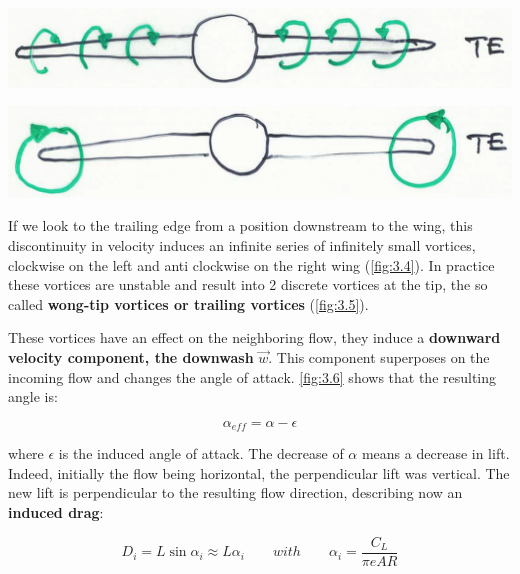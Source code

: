 	\begin{center}
	\begin{minipage}{0.4\textwidth}
	\includegraphics[scale=0.25]{ch3/4}
	\label{fig:3.4}
	\end{minipage}
	\begin{minipage}{0.4\textwidth}
	\includegraphics[scale=0.22]{ch3/5}
	\label{fig:3.5}
	\end{minipage}
	\end{center}
	
	If we look to the trailing edge from a position downstream to the wing, this discontinuity in velocity induces an infinite series of infinitely small vortices, clockwise on the left and anti clockwise on the right wing (\autoref{fig:3.4}). In practice these vortices are unstable and result into 2 discrete vortices at the tip, the so called \textbf{wong-tip vortices or trailing vortices} (\autoref{fig:3.5}). 
	
	These vortices have an effect on the neighboring flow, they induce a \textbf{downward velocity component, the downwash} $\vec{w}$. This component superposes on the incoming flow and changes the angle of attack. \autoref{fig:3.6} shows that the resulting angle is: 
	
	\begin{equation}
	\alpha _{eff} = \alpha - \epsilon
	\end{equation}
	
	where $\epsilon$ is the induced angle of attack. The decrease of $\alpha$ means a decrease in lift. Indeed, initially the flow being horizontal, the perpendicular lift was vertical. The new lift is perpendicular to the resulting flow direction, describing now an \textbf{induced drag}: 
	
	\begin{equation}
	D_i = L \sin \alpha _i \approx L\alpha _i \qquad with \qquad \alpha _i = \frac{C_L}{\pi e AR} 
	\label{eq:3.2}
	\end{equation}
	
